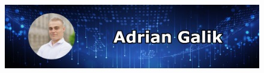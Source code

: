 \documentclass[10pt]{article}
\begin{document}
\begin{figure}[t]
    \hskip-1.55cm\includegraphics[scale=1.3625]{Galik_BANNER.png}
\end{figure}

\setlength{\columnsep}{2cm}  
\begin{paracol}{2}


\end{paracol}
\end{document}
